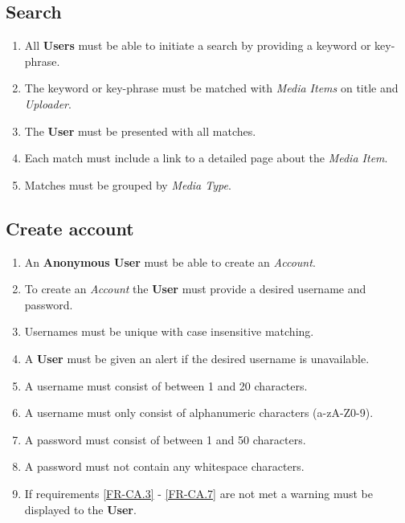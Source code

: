 

%

\subsection {Search}

\begin{enumerate}[label=FR-\twodigits*]

	\item All \textbf{Users} must be able to initiate a search by providing a keyword or key-phrase.
	\item The keyword or key-phrase must be matched with \textit{Media Items} on title and \textit{Uploader}.
	\item The \textbf{User} must be presented with all matches.
	\item Each match must include a link to a detailed page about the \textit{Media Item}.
	\item Matches must be grouped by \textit{Media Type}. 
\end{enumerate}	
			
\subsection{Create account}

\begin{enumerate}[label=FR-\twodigits*, resume]
	\item An \textbf{Anonymous User} must be able to create an \textit{Account}.
	\item To create an \textit{Account} the \textbf{User} must provide a desired username and password.
	\item Usernames must be unique with case insensitive matching. \label{FR-CA.3}
	\item A \textbf{User} must be given an alert if the desired username is unavailable.
	\item A username must consist of between 1 and 20 characters.
	\item A username must only consist of alphanumeric characters (a-zA-Z0-9).
	\item A password must consist of between 1 and 50 characters. 
	\label{FR-CA.6}
	\item A password must not contain any whitespace characters. \label{FR-CA.7}
	\item If requirements \ref{FR-CA.3} - \ref{FR-CA.7} are not met a warning must be displayed to the \textbf{User}.
\end{enumerate}
	
